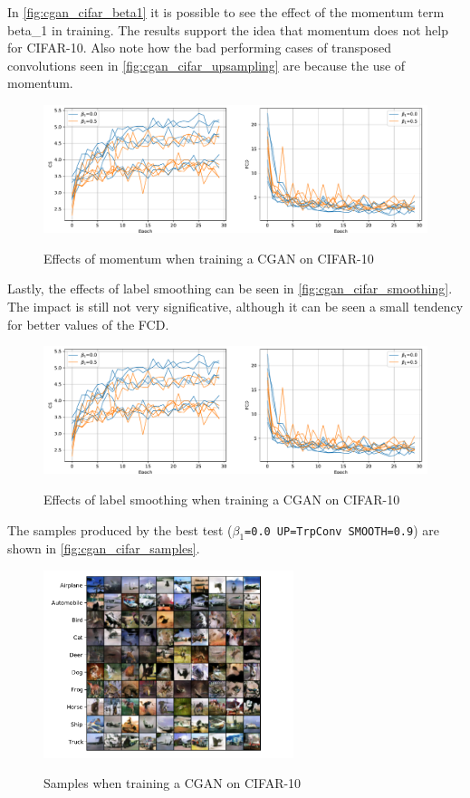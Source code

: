 In \autoref{fig:cgan_cifar_beta1} it is possible to see the effect of the momentum term \gls{beta_1} in training. The results support the idea that momentum does not help for \gls{CIFAR}-10. Also note how the bad performing cases of transposed convolutions seen in \autoref{fig:cgan_cifar_upsampling} are because the use of momentum.
\begin{figure}[hbt]
    \centering
    \caption{Effects of momentum when training a CGAN on CIFAR-10}
    \includegraphics[width=\textwidth]{chapters/Experiments/CGAN/cifar_beta1.pdf}
    \label{fig:cgan_cifar_beta1}
\end{figure}

Lastly, the effects of label smoothing can be seen in \autoref{fig:cgan_cifar_smoothing}. The impact is still not very significative, although it can be seen a small tendency for better values of the \gls{FCD}.
\begin{figure}[hbt]
    \centering
    \caption{Effects of label smoothing when training a CGAN on CIFAR-10}
    \includegraphics[width=\textwidth]{chapters/Experiments/CGAN/cifar_beta1.pdf}
    \label{fig:cgan_cifar_smoothing}
\end{figure}

The samples produced by the best test (\texttt{$\beta_1$=0.0 UP=TrpConv SMOOTH=0.9}) are shown in \autoref{fig:cgan_cifar_samples}.
\begin{figure}[hbt]
    \centering
    \caption{Samples when training a CGAN on CIFAR-10}
    \includegraphics[width=0.65\textwidth]{chapters/Experiments/CGAN/cifar_samples.pdf}
    \label{fig:cgan_cifar_samples}
\end{figure}
